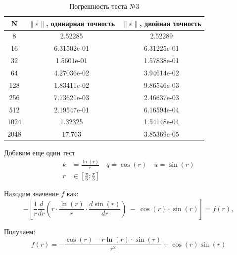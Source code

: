   \begin{table}[H]
    \centering
    \begin{tabular}{c | c | c}
      \toprule
      N & $ \left\lVert \varepsilon \right\rVert  $, одинарная точность & $ \left\lVert \varepsilon \right\rVert  $, двойная точность \\
      \midrule
      8 & 2.52285 & 2.52289\\
      16 & 6.31502e-01 & 6.31225e-01\\
      32 & 1.5601e-01 & 1.57838e-01\\
      64 & 4.27036e-02 & 3.94614e-02\\
      128 & 1.83411e-02 & 9.86546e-03\\
      256 & 7.73621e-03 & 2.46637e-03\\
      512 & 2.19547e-01 & 6.16594e-04\\
      1024 & 1.32325 & 1.54148e-04\\
      2048 & 17.763 & 3.85369e-05\\
      \bottomrule
    \end{tabular}
    \caption{Погрешность теста №3}
  \end{table}

  Добавим еще один тест
  \begin{align*}
    k &= \frac{\ln(r)}{r} \quad q = \cos(r) \quad u = \sin(r) \\
    r &\in [\frac{\pi}{6}; \frac{\pi}{3} ]
  \end{align*}

  Находим значение $f$ как:
  \[
    -\left[ \frac{1}{r} \frac{d}{dr} \left(r \cdot \frac{\ln(r)}{r} \cdot \frac{d \sin(r)}{dr} \right)\ -\ \cos(r) \cdot \sin(r) \right] = f(r),
  \]

  Получаем:
  \[
    f(r) = -\frac{\cos(r) - r\ln(r)\cdot\sin(r)}{r^2} + \cos(r)\sin(r)
  \]

